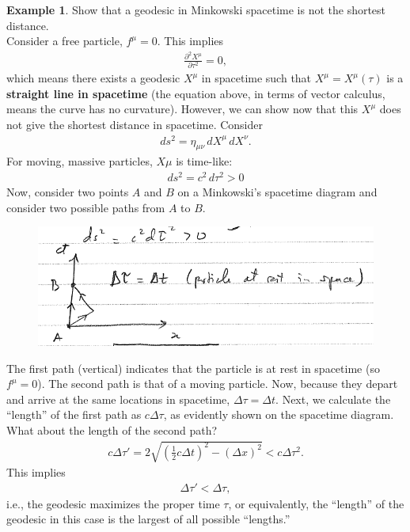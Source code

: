 \documentclass{book}
\theoremstyle{definition}
\newtheorem{exmp}{Example}[section]
\begin{document}
\begin{exmp}
	Show that a geodesic in Minkowski spacetime is not the shortest distance. \\
	
	Consider a free particle, $f^\mu = 0$. This implies
	\begin{align*}
	\frac{\partial^2 X^\mu}{\partial \tau^2} = 0,
	\end{align*}
	which means there exists a geodesic $X^\mu$ in spacetime such that $X^\mu = X^\mu(\tau)$ is a \textbf{straight line in spacetime} (the equation above, in terms of vector calculus, means the curve has no curvature). However, we can show now that this $X^\mu$ does not give the shortest distance in spacetime. Consider
	\begin{align*}
	ds^2 = \eta_{\mu\nu}\,dX^\mu\,dX^\nu.
	\end{align*}
	For moving, massive particles, $X\mu$ is time-like: 
	\begin{align*}
	ds^2 = c^2\,d\tau^2 > 0
	\end{align*}
	Now, consider two points $A$ and $B$ on a Minkowski's spacetime diagram and consider two possible paths from $A$ to $B$.
	\begin{figure}[!htb]
		\centering
		\includegraphics[scale=0.6]{timelike}
	\end{figure}
	The first path (vertical) indicates that the particle is at rest in spacetime (so $f^\mu = 0$). The second path is that of a moving particle. Now, because they depart and arrive at the same locations in spacetime, $\Delta\tau = \Delta t$. Next, we calculate the ``length'' of the first path as $c\Delta \tau$, as evidently shown on the spacetime diagram. What about the length of the second path?
	\begin{align*}
	c\Delta \tau' = 2\sqrt{\left( \frac{1}{2}c\Delta t \right)^2  - \left( \Delta x \right)^2  } < c\Delta\tau^2.
	\end{align*}
	This implies
	\begin{align*}
	\Delta \tau' < \Delta \tau,
	\end{align*}
	i.e., the geodesic maximizes the proper time $\tau$, or equivalently, the ``length'' of the geodesic in this case is the largest of all possible ``lengths.'' 
\end{exmp} 
\end{document}
